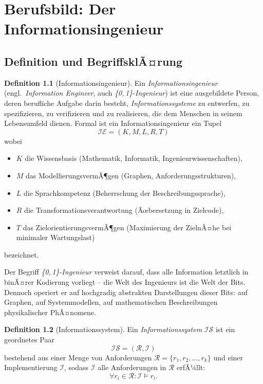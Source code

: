 ﻿\documentclass[a4paper,12pt]{report}
\theoremstyle{definition}
\newtheorem{definition}{Definition}[section]
\begin{document}

\chapter{Berufsbild: Der Informationsingenieur}
\label{sec:berufsbild}

\section{Definition und BegriffsklÃ¤rung}

\begin{definition}[Informationsingenieur]
\label{def:infeng}
Ein \emph{Informationsingenieur} (engl.\ \emph{Information Engineer}, auch
\emph{\{0,\,1\}-Ingenieur}) ist eine ausgebildete Person, deren berufliche Aufgabe darin
besteht, \emph{Informationssysteme} zu entwerfen, zu spezifizieren, zu verifizieren und zu
realisieren, die dem Menschen in seinem Lebensumfeld dienen.
Formal ist ein Informationsingenieur ein Tupel
\[
  \mathcal{IE} = (K, M, L, R, T)
\]
wobei
\begin{itemize}
  \item $K$ die Wissensbasis (Mathematik, Informatik, Ingenieurwissenschaften),
  \item $M$ das ModellierungsvermÃ¶gen (Graphen, Anforderungsstrukturen),
  \item $L$ die Sprachkompetenz (Beherrschung der Beschreibungssprache),
  \item $R$ die Transformationsverantwortung (Ãœbersetzung in Zielcode),
  \item $T$ das ZielorientierungsvermÃ¶gen (Maximierung der ZielnÃ¤he bei minimaler Wartungslast)
\end{itemize}
bezeichnet.
\end{definition}

Der Begriff \emph{\{0,\,1\}-Ingenieur} verweist darauf, dass alle Information letztlich in
binÃ¤rer Kodierung vorliegt -- die Welt des Ingenieurs ist die Welt der Bits. Dennoch operiert
er auf hochgradig abstrakten Darstellungen dieser Bits: auf Graphen, auf Systemmodellen, auf
mathematischen Beschreibungen physikalischer PhÃ¤nomene.

\begin{definition}[Informationssystem]
\label{def:infosys}
Ein \emph{Informationssystem} $\mathcal{IS}$ ist ein geordnetes Paar
\[
  \mathcal{IS} = (\mathcal{R}, \mathcal{I})
\]
bestehend aus einer Menge von Anforderungen $\mathcal{R} = \{r_1, r_2, \ldots, r_k\}$ und
einer Implementierung $\mathcal{I}$, sodass $\mathcal{I}$ alle Anforderungen in $\mathcal{R}$
erfÃ¼llt:
\[
  \forall r_i \in \mathcal{R}: \mathcal{I} \models r_i.
\]
\end{definition}
\end{document}
